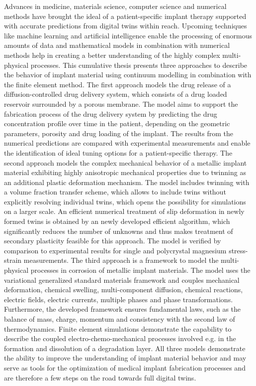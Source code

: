 Advances in medicine, materials science, computer science and numerical methods have brought the ideal of a patient-specific implant therapy supported with accurate predictions from digital twins within reach. Upcoming techniques like machine learning and artificial intelligence enable the processing of enormous amounts of data and mathematical models in combination with numerical methods help in creating a better understanding of the highly complex multi-physical processes. This cumulative thesis presents three approaches to describe the behavior of implant material using continuum modelling in combination with the finite element method. The first approach models the drug release of a diffusion-controlled drug delivery system, which consists of a drug loaded reservoir surrounded by a porous membrane. The model aims to support the fabrication process of the drug delivery system by predicting the drug concentration profile over time in the patient, depending on the geometric parameters, porosity and drug loading of the implant. The results from the numerical predictions are compared with experimental measurements and enable the identification of ideal tuning options for a patient-specific therapy. The second approach models the complex mechanical behavior of a metallic implant material exhibiting highly anisotropic mechanical properties due to twinning as an additional plastic deformation mechanism. The model includes twinning with a volume fraction transfer scheme, which allows to include twins without explicitly resolving individual twins, which opens the possibility for simulations on a larger scale. An efficient numerical treatment of slip deformation in newly formed twins is obtained by an newly developed efficient algorithm, which significantly reduces the number of unknowns and thus makes treatment of secondary plasticity feasible for this approach. The model is verified by comparison to experimental results for single and polycrystal magnesium stress-strain measurements. The third approach is a framework to model the multi-physical processes in corrosion of metallic implant materials. The model uses the variational generalized standard materials framework and couples mechanical deformation, chemical swelling, multi-component diffusion, chemical reactions, electric fields, electric currents, multiple phases and phase transformations. Furthermore, the developed framework ensures fundamental laws, such as the balance of mass, charge, momentum and consistency with the second law of thermodynamics. Finite element simulations demonstrate the capability to describe the coupled electro-chemo-mechanical processes involved e.g. in the formation and dissolution of a degradation layer. All three models demonstrate the ability to improve the understanding of implant material behavior and may serve as tools for the optimization of medical implant fabrication processes and are therefore a few steps on the road towards full digital twins. 